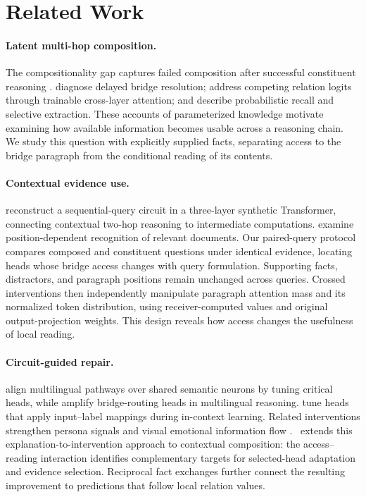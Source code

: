 \section{Related Work}
\label{sec:related}

\paragraph{Latent multi-hop composition.}
The compositionality gap captures failed composition after successful constituent reasoning \citep{press2023compositionality}. \citet{biran2024hopping} diagnose delayed bridge resolution; \citet{yu2025back} address competing relation logits through trainable cross-layer attention; and \citet{liu2026layerorder} describe probabilistic recall and selective extraction. These accounts of parameterized knowledge motivate examining how available information becomes usable across a reasoning chain. We study this question with explicitly supplied facts, separating access to the bridge paragraph from the conditional reading of its contents.

\paragraph{Contextual evidence use.}
\citet{guo2025twohop} reconstruct a sequential-query circuit in a three-layer synthetic Transformer, connecting contextual two-hop reasoning to intermediate computations. \citet{zhang2026failure} examine position-dependent recognition of relevant documents. Our paired-query protocol compares composed and constituent questions under identical evidence, locating heads whose bridge access changes with query formulation. Supporting facts, distractors, and paragraph positions remain unchanged across queries. Crossed interventions then independently manipulate paragraph attention mass and its normalized token distribution, using receiver-computed values and original output-projection weights. This design reveals how access changes the usefulness of local reading.

\paragraph{Circuit-guided repair.}
\citet{sun2026bridging} align multilingual pathways over shared semantic neurons by tuning critical heads, while \citet{kim2026bridge} amplify bridge-routing heads in multilingual reasoning. \citet{sun2025mappings} tune heads that apply input--label mappings during in-context learning. Related interventions strengthen persona signals \citep{qin2026persona} and visual emotional information flow \citep{zhang2026emotional}. \method\ extends this explanation-to-intervention approach to contextual composition: the access--reading interaction identifies complementary targets for selected-head adaptation and evidence selection. Reciprocal fact exchanges further connect the resulting improvement to predictions that follow local relation values.

